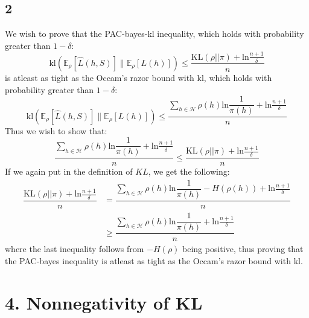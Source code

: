 \documentclass{article}
\begin{document}
\subsection{2}
We wish to prove that the PAC-bayes-kl inequality, which holds with probability greater than $1-\delta$:
\begin{equation}
\label{eq:thistight}
\text{kl}\left( \mathbb{E}_\rho \left[\hat{L}(h,S)\right] \parallel \mathbb{E}_\rho \left[L(h)\right] \right) \leq \dfrac{\text{KL}(\rho || \pi) + \text{ln} \frac{n+1}{\delta}}{n}
\end{equation}
is atleast as tight as the Occam's razor bound with kl, which holds with probability greater than $1- \delta$:
\begin{equation}
\text{kl}\left( \mathbb{E}_\rho \left[\hat{L}(h,S)\right] \parallel \mathbb{E}_\rho \left[L(h)\right] \right)  \leq \dfrac{\sum\limits_{h \in \mathcal{H}} \rho(h) \text{ln} \dfrac{1}{\pi(h)} + \text{ln} \frac{n+1}{\delta}}{n}
\end{equation}
Thus we wish to show that:
\begin{equation}
\dfrac{\sum\limits_{h \in \mathcal{H}} \rho(h) \text{ln} \dfrac{1}{\pi(h)} + \text{ln} \frac{n+1}{\delta}}{n} \leq \dfrac{\text{KL}(\rho || \pi) + \text{ln} \frac{n+1}{\delta}}{n} 
\end{equation}
If we again put in the definition of $KL$, we get the following:
\begin{align}
\dfrac{\text{KL}(\rho || \pi) + \text{ln} \frac{n+1}{\delta}}{n} &= \dfrac{\sum\limits_{h \in \mathcal{H}} \rho(h) \text{ln} \dfrac{1}{\pi(h)} - H(\rho(h)) + \text{ln} \frac{n+1}{\delta}}{n} \\
&\geq \dfrac{\sum\limits_{h \in \mathcal{H}} \rho(h) \text{ln} \dfrac{1}{\pi(h)} + \text{ln} \frac{n+1}{\delta}}{n}
\end{align}
where the last inequality follows from $-H(\rho)$ being positive, thus proving that the PAC-bayes inequality is atleast as tight as the Occam's razor bound with kl.
\section{4. Nonnegativity of KL}
\end{document}
